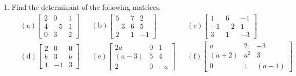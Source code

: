 \begin{enumerate}
\item Find the determinant of the following matrices.
\begin{align*}
&\mathrm{(a)} \left[ \begin{array}{rrr} 2&0&1\\ 4&-5&1 \\ 0&3&2 \end{array} \right]&
&\mathrm{(b)} \left[ \begin{array}{rrr} 5&7&2\\-3&6&5\\ 2&1&-1\end{array} \right]&
&\mathrm{(c)} \left[ \begin{array}{rrr} 1&6&-1\\-1&-2&1 \\ 3&1&-3\end{array} \right ]\\
&\mathrm{(d)} \left[ \begin{array}{rrr} 2&0&0\\ b&3&b\\ 1&-1&3 \end{array} \right]&
&\mathrm{(e)} \left[ \begin{array}{crr} 2a&0&1\\ (a-3)&5&4\\ 2&0&-a \end{array} \right]&
&\mathrm{(f)} \left [ \begin{array}{ccc} a&2&-3\\(a+2)&a^2&3\\0&1&(a-1)\end{array} \right]
\end{align*}


\end{enumerate}
